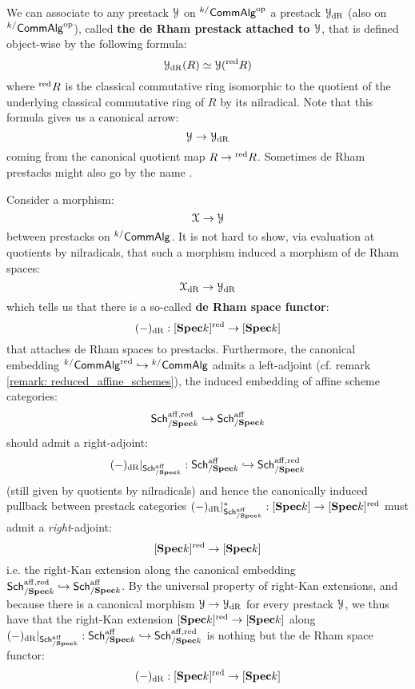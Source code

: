                 \begin{definition} \label{def: de_rham_prestack}
                    We can associate to any prestack $\mathcal{Y}$ on ${}^{k/}\mathsf{Comm}\mathsf{Alg}^{\mathrm{op}}$ a prestack $\mathcal{Y}_{\mathrm{dR}}$ (also on ${}^{k/}\mathsf{Comm}\mathsf{Alg}^{\mathrm{op}}$), called \textbf{the de Rham prestack attached to $\mathcal{Y}$}, that is defined object-wise by the following formula:
                        $$\mathcal{Y}_{\mathrm{dR}}(R) \simeq \mathcal{Y}({}^{\mathrm{red}}R)$$
                    where ${}^{\mathrm{red}}R$ is the classical commutative ring isomorphic to the quotient of the underlying classical commutative ring of $R$ by its nilradical. Note that this formula gives us a canonical arrow:
                        $$\mathcal{Y} \to \mathcal{Y}_{\mathrm{dR}}$$
                    coming from the canonical quotient map $R \to {}^{\mathrm{red}}R$. Sometimes de Rham prestacks might also go by the name .
                \end{definition}
                \begin{remark} \label{remark: de_rham_prestacks_functoriality}
                    Consider a morphism:
                        $$\mathcal{X} \to \mathcal{Y}$$
                    between prestacks on ${}^{k/}\mathsf{Comm}\mathsf{Alg}$. It is not hard to show, via evaluation at quotients by nilradicals, that such a morphism induced a morphism of de Rham spaces:
                        $$\mathcal{X}_{\mathrm{dR}} \to \mathcal{Y}_{\mathrm{dR}}$$
                    which tells us that there is a so-called \textbf{de Rham space functor}:
                        $$(-)_{\mathrm{dR}}: [\mathbf{Spec} k]^{\mathrm{red}} \to [\mathbf{Spec} k]$$
                    that attaches de Rham spaces to prestacks. Furthermore, the canonical embedding ${}^{k/}\mathsf{Comm}\mathsf{Alg}^{\mathrm{red}} \hookrightarrow {}^{k/}\mathsf{Comm}\mathsf{Alg}$ admits a left-adjoint (cf. remark \ref{remark: reduced_affine_schemes}), the induced embedding of affine scheme categories:
                        $$\mathsf{Sch}^{\mathrm{aff}, \mathrm{red}}_{/\mathbf{Spec} k} \hookrightarrow \mathsf{Sch}^{\mathrm{aff}}_{/\mathbf{Spec} k}$$
                    should admit a right-adjoint:
                        $$(-)_{\mathrm{dR}}|_{\mathsf{Sch}^{\mathrm{aff}}_{/\mathbf{Spec} k}}: \mathsf{Sch}^{\mathrm{aff}}_{/\mathbf{Spec} k} \hookrightarrow \mathsf{Sch}^{\mathrm{aff}, \mathrm{red}}_{/\mathbf{Spec} k}$$
                    (still given by quotients by nilradicals) and hence the canonically induced pullback between prestack categories $(-)_{\mathrm{dR}}|_{\mathsf{Sch}^{\mathrm{aff}}_{/\mathbf{Spec} k}}^*: [\mathbf{Spec} k] \to [\mathbf{Spec} k]^{\mathrm{red}}$ must admit a \textit{right}-adjoint:
                        $$[\mathbf{Spec} k]^{\mathrm{red}} \to [\mathbf{Spec} k]$$
                    i.e. the right-Kan extension along the canonical embedding $\mathsf{Sch}^{\mathrm{aff}, \mathrm{red}}_{/\mathbf{Spec} k} \hookrightarrow \mathsf{Sch}^{\mathrm{aff}}_{/\mathbf{Spec} k}$. By the universal property of right-Kan extensions, and because there is a canonical morphism $\mathcal{Y} \to \mathcal{Y}_{\mathrm{dR}}$ for every prestack $\mathcal{Y}$, we thus have that the right-Kan extension $[\mathbf{Spec} k]^{\mathrm{red}} \to [\mathbf{Spec} k]$ along $(-)_{\mathrm{dR}}|_{\mathsf{Sch}^{\mathrm{aff}}_{/\mathbf{Spec} k}}: \mathsf{Sch}^{\mathrm{aff}}_{/\mathbf{Spec} k} \hookrightarrow \mathsf{Sch}^{\mathrm{aff}, \mathrm{red}}_{/\mathbf{Spec} k}$ is nothing but the de Rham space functor:
                        $$(-)_{\mathrm{dR}}: [\mathbf{Spec} k]^{\mathrm{red}} \to [\mathbf{Spec} k]$$
                \end{remark}
                

